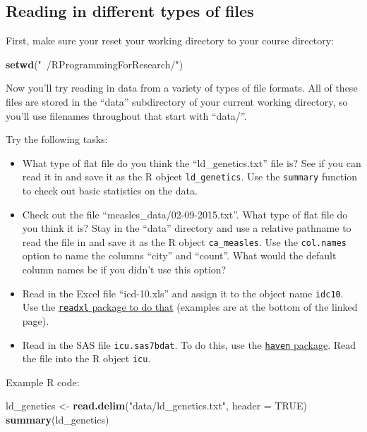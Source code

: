 \documentclass[]{book}
\makeatletter
\newenvironment{Shaded}{\begin{snugshade}}{\end{snugshade}}
\newcommand{\KeywordTok}[1]{\textcolor[rgb]{0.13,0.29,0.53}{\textbf{{#1}}}}
\newcommand{\DataTypeTok}[1]{\textcolor[rgb]{0.13,0.29,0.53}{{#1}}}
\newcommand{\StringTok}[1]{\textcolor[rgb]{0.31,0.60,0.02}{{#1}}}
\newcommand{\OtherTok}[1]{\textcolor[rgb]{0.56,0.35,0.01}{{#1}}}
\newcommand{\NormalTok}[1]{{#1}}
\providecommand{\tightlist}{%
  \setlength{\itemsep}{0pt}\setlength{\parskip}{0pt}}
\newenvironment{kframe}{%
\medskip{}
\setlength{\fboxsep}{.8em}
 \def\at@end@of@kframe{}%
 \ifinner\ifhmode%
  \def\at@end@of@kframe{\end{minipage}}%
  \begin{minipage}{\columnwidth}%
 \fi\fi%
 \def\FrameCommand##1{\hskip\@totalleftmargin \hskip-\fboxsep
 \colorbox{shadecolor}{##1}\hskip-\fboxsep
     \hskip-\linewidth \hskip-\@totalleftmargin \hskip\columnwidth}%
 \MakeFramed {\advance\hsize-\width
   \@totalleftmargin\z@ \linewidth\hsize
   \@setminipage}}%
 {\par\unskip\endMakeFramed%
 \at@end@of@kframe}
\renewenvironment{Shaded}{\begin{kframe}}{\end{kframe}}
\makeatother
\begin{document}
\subsection{Reading in different types of
files}\label{reading-in-different-types-of-files}

First, make sure your reset your working directory to your course
directory:

\begin{Shaded}
\begin{Highlighting}[]
\KeywordTok{setwd}\NormalTok{(}\StringTok{"~/RProgrammingForResearch/"}\NormalTok{)}
\end{Highlighting}
\end{Shaded}

Now you'll try reading in data from a variety of types of file formats.
All of these files are stored in the ``data'' subdirectory of your
current working directory, so you'll use filenames throughout that start
with ``data/''.

Try the following tasks:

\begin{itemize}
\tightlist
\item
  What type of flat file do you think the ``ld\_genetics.txt'' file is?
  See if you can read it in and save it as the R object
  \texttt{ld\_genetics}. Use the \texttt{summary} function to check out
  basic statistics on the data.
\item
  Check out the file ``measles\_data/02-09-2015.txt''. What type of flat
  file do you think it is? Stay in the ``data'' directory and use a
  relative pathname to read the file in and save it as the R object
  \texttt{ca\_measles}. Use the \texttt{col.names} option to name the
  columns ``city'' and ``count''. What would the default column names be
  if you didn't use this option?
\item
  Read in the Excel file ``icd-10.xls'' and assign it to the object name
  \texttt{idc10}. Use the
  \href{https://github.com/hadley/readxl}{\texttt{readxl} package to do
  that} (examples are at the bottom of the linked page).
\item
  Read in the SAS file \texttt{icu.sas7bdat}. To do this, use the
  \href{https://github.com/hadley/haven}{\texttt{haven} package}. Read
  the file into the R object \texttt{icu}.
\end{itemize}

Example R code:

\begin{Shaded}
\begin{Highlighting}[]
\NormalTok{ld_genetics <-}\StringTok{ }\KeywordTok{read.delim}\NormalTok{(}\StringTok{"data/ld_genetics.txt"}\NormalTok{, }\DataTypeTok{header =} \OtherTok{TRUE}\NormalTok{)}
\KeywordTok{summary}\NormalTok{(ld_genetics)}
\end{Highlighting}
\end{Shaded}
\end{document}
